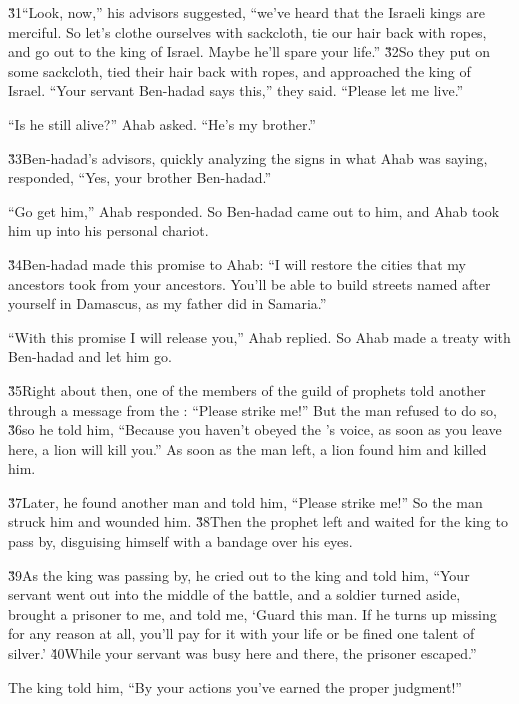 \v{31}``Look, now,'' his advisors suggested, ``we've heard that the Israeli kings are merciful. So let's clothe ourselves with sackcloth, tie our hair back with ropes, and go out to the king of Israel. Maybe he'll spare your life.'' \v{32}So they put on some sackcloth, tied their hair back with ropes, and approached the king of Israel. ``Your servant Ben-hadad says this,'' they said. ``Please let me live.''

``Is he still alive?'' Ahab asked. ``He's my brother.''

\v{33}Ben-hadad's advisors, quickly analyzing the signs in what Ahab was saying, responded, ``Yes, your brother Ben-hadad.''

``Go get him,'' Ahab responded. So Ben-hadad came out to him, and Ahab took him up into his personal chariot.

\v{34}Ben-hadad made this promise to Ahab: ``I will restore the cities that my ancestors took from your ancestors. You'll be able to build streets named after yourself in Damascus, as my father did in Samaria.''

``With this promise I will release you,'' Ahab replied. So Ahab made a treaty with Ben-hadad and let him go.

\v{35}Right about then, one of the members of the guild of prophets told another through a message from the : ``Please strike me!'' But the man refused to do so, \v{36}so he told him, ``Because you haven't obeyed the 's voice, as soon as you leave here, a lion will kill you.'' As soon as the man left, a lion found him and killed him.

\v{37}Later, he found another man and told him, ``Please strike me!'' So the man struck him and wounded him. \v{38}Then the prophet left and waited for the king to pass by, disguising himself with a bandage over his eyes.

\v{39}As the king was passing by, he cried out to the king and told him, ``Your servant went out into the middle of the battle, and a soldier turned aside, brought a prisoner to me, and told me, `Guard this man. If he turns up missing for any reason at all, you'll pay for it with your life or be fined one talent of silver.' \v{40}While your servant was busy here and there, the prisoner escaped.''

The king told him, ``By your actions you've earned the proper judgment!''

